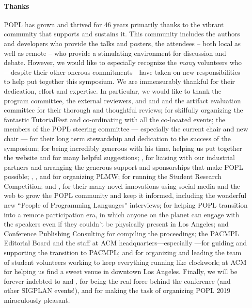 \paragraph{Thanks}
%
POPL has grown and thrived for 46 years primarily thanks to
the vibrant community that supports and sustains it.
%
This community includes the authors and developers who
provide the talks and posters, the attendees -- both local
as well as remote -- who provide a stimulating environment
for discussion and debate.
%
However, we would like to especially recognize the \emph{many}
volunteers who---despite their other onerous commitments---have
taken on new responsibilities to help put together this symposium.
%
We are immeasurably thankful for their dedication, effort and expertise.
%
In particular, we would like to thank
%
the program committee, the external reviewers,
and  and 
and the artifact evaluation committee for their
thorough and thoughtful reviews;
%
 for skilfully organizing
the fantastic TutorialFest and co-ordinating with
all the co-located events;
%
the members of the POPL steering committee --- especially the current
chair  and new chair  ---
for their long term stewardship and dedication to the success
of the symposium;
%
 for being incredibly generous with his time,
helping us put together the website and for many helpful
suggestions;
%
, for liaising with our industrial
partners and arranging the generous support and
sponsorships that make POPL possible;
%
, ,
 and 
for organizing PLMW;
%
 for running the Student Research Competition;
%
 and , for their many novel innovations
using social media and the web to grow the POPL community and
keep it informed, including the wonderful new ``People of Programming Languages''
interviews;
%
 for helping POPL transition into a remote participation
era, in which anyone on the planet can engage with the speakers even
if they couldn't be physically present in Los Angeles;
%
%
 and Conference Publishing Consulting
for compiling the proceedings;
%
the PACMPL Editorial Board and the staff at ACM
headquarters---especially ---for guiding
and supporting the transition to PACMPL;
%
 and  for organizing
and leading the team of student volunteers
working to keep everything running like clockwork;
%
 at ACM for helping us find a sweet
venue in downtown Los Angeles.
%
Finally, we will be forever indebted to
 and ,
for being the real force behind the conference
(and other SIGPLAN events!), and for making the
task of organizing POPL 2019 miraculously pleasant.


